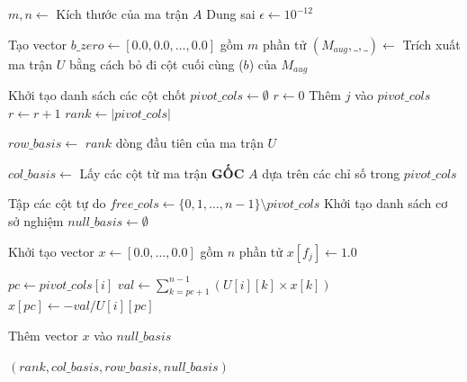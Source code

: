 

\begin{algorithm}[H]
\caption{Xác định Hạng và Cơ sở của ma trận}
\label{alg:rank_and_basis}
\begin{algorithmic}[1]
    \State $m, n \gets$ Kích thước của ma trận $A$
    \State Dung sai $\epsilon \gets 10^{-12}$

    \State {}
    \State Tạo vector $b\_zero \gets [0.0, 0.0, \dots, 0.0]$ gồm $m$ phần tử
    \State $(M_{aug}, \_, \_) \gets$ 
    \State Trích xuất ma trận $U$ bằng cách bỏ đi cột cuối cùng ($b$) của $M_{aug}$

    \State {}
    \State Khởi tạo danh sách các cột chốt $pivot\_cols \gets \emptyset$
    \State $r \gets 0$
            \State Thêm $j$ vào $pivot\_cols$
            \State $r \gets r + 1$
        \EndIf
    \EndFor
    \State $rank \gets |pivot\_cols|$ 

    \State {}
    \State $row\_basis \gets$ $rank$ dòng đầu tiên của ma trận $U$

    \State {}
    \State $col\_basis \gets$ Lấy các cột từ ma trận \textbf{GỐC} $A$ dựa trên các chỉ số trong $pivot\_cols$

    \State {}
    \State Tập các cột tự do $free\_cols \gets \{0, 1, \dots, n-1\} \setminus pivot\_cols$
    \State Khởi tạo danh sách cơ sở nghiệm $null\_basis \gets \emptyset$

        \State Khởi tạo vector $x \gets [0.0, \dots, 0.0]$ gồm $n$ phần tử
        \State $x[f_j] \gets 1.0$ 
        
            \State $pc \gets pivot\_cols[i]$
            \State $val \gets \sum_{k = pc+1}^{n-1} (U[i][k] \times x[k])$
            \State $x[pc] \gets -val / U[i][pc]$ 
        \EndFor
        
        \State Thêm vector $x$ vào $null\_basis$
    \EndFor

    \State \Return $(rank, col\_basis, row\_basis, null\_basis)$
\EndProcedure
\end{algorithmic}
\end{algorithm}

